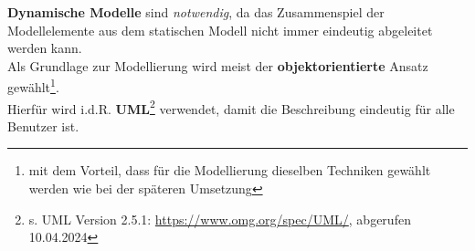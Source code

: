 \noindent
\textbf{Dynamische Modelle} sind \textit{notwendig}, da das Zusammenspiel der Modellelemente aus dem statischen Modell nicht immer eindeutig abgeleitet werden kann.\\

\noindent
Als Grundlage zur Modellierung wird meist der \textbf{objektorientierte} Ansatz gewählt\footnote{
    mit dem Vorteil, dass für die Modellierung dieselben Techniken gewählt werden wie bei der späteren Umsetzung
}.\\

\noindent
Hierfür wird i.d.R. \textbf{UML}\footnote{
s. UML Version 2.5.1: \url{https://www.omg.org/spec/UML/}, abgerufen 10.04.2024
} verwendet, damit die Beschreibung eindeutig für alle Benutzer ist.